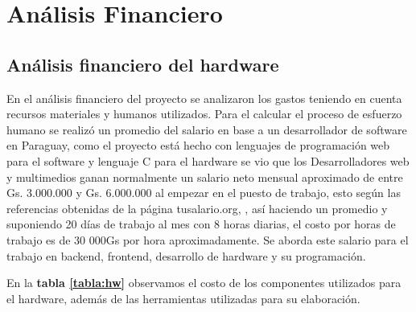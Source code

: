 \chapter[Análisis Financiero]{Análisis Financiero}

\section{Análisis financiero del hardware}
En el análisis financiero del proyecto se analizaron los gastos teniendo en cuenta  recursos materiales y humanos utilizados. Para el calcular el proceso de esfuerzo humano se realizó un promedio del salario en base a un desarrollador de software en Paraguay, como el proyecto está hecho con lenguajes de programación web para el software y lenguaje C para el hardware se vio que los Desarrolladores web y multimedios ganan normalmente un salario neto mensual aproximado de entre Gs. 3.000.000 y Gs. 6.000.000 al empezar en el puesto de trabajo, esto según las referencias obtenidas de la página tusalario.org, \cite{tusalario}, así haciendo un promedio y suponiendo 20 días de trabajo al mes con 8 horas diarias, el costo por horas de trabajo es de 30 000Gs por hora aproximadamente. Se aborda este salario para el trabajo en backend, frontend, desarrollo de hardware y su programación. 


En la  \textbf{tabla \ref{tabla:hw}} observamos el costo de los componentes utilizados para el hardware, además de las herramientas utilizadas para su elaboración. 



